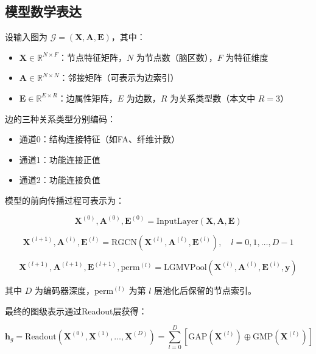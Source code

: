 \documentclass[UTF8, a4paper, 12pt]{article}
\begin{document}
\subsection{模型数学表达}

设输入图为 $\mathcal{G} = (\mathbf{X}, \mathbf{A}, \mathbf{E})$，其中：
\begin{itemize}
    \item $\mathbf{X} \in \mathbb{R}^{N \times F}$：节点特征矩阵，$N$ 为节点数（脑区数），$F$ 为特征维度
    \item $\mathbf{A} \in \mathbb{R}^{N \times N}$：邻接矩阵（可表示为边索引）
    \item $\mathbf{E} \in \mathbb{R}^{E \times R}$：边属性矩阵，$E$ 为边数，$R$ 为关系类型数（本文中 $R=3$）
\end{itemize}

边的三种关系类型分别编码：
\begin{itemize}
    \item 通道0：结构连接特征（如FA、纤维计数）
    \item 通道1：功能连接正值
    \item 通道2：功能连接负值
\end{itemize}

模型的前向传播过程可表示为：

\begin{equation}
\mathbf{X}^{(0)}, \mathbf{A}^{(0)}, \mathbf{E}^{(0)} = \text{InputLayer}(\mathbf{X}, \mathbf{A}, \mathbf{E})
\end{equation}

\begin{equation}
\mathbf{X}^{(l+1)}, \mathbf{A}^{(l)}, \mathbf{E}^{(l)} = \text{RGCN}\left(\mathbf{X}^{(l)}, \mathbf{A}^{(l)}, \mathbf{E}^{(l)}\right), \quad l = 0, 1, \ldots, D-1
\end{equation}

\begin{equation}
\mathbf{X}^{(l+1)}, \mathbf{A}^{(l+1)}, \mathbf{E}^{(l+1)}, \text{perm}^{(l)} = \text{LGMVPool}\left(\mathbf{X}^{(l)}, \mathbf{A}^{(l)}, \mathbf{E}^{(l)}, \mathbf{y}\right)
\end{equation}

其中 $D$ 为编码器深度，$\text{perm}^{(l)}$ 为第 $l$ 层池化后保留的节点索引。

最终的图级表示通过Readout层获得：

\begin{equation}
\mathbf{h}_g = \text{Readout}(\mathbf{X}^{(0)}, \mathbf{X}^{(1)}, \ldots, \mathbf{X}^{(D)}) = \sum_{l=0}^{D} \left[ \text{GAP}(\mathbf{X}^{(l)}) \oplus \text{GMP}(\mathbf{X}^{(l)}) \right]
\end{equation}
\end{document}

